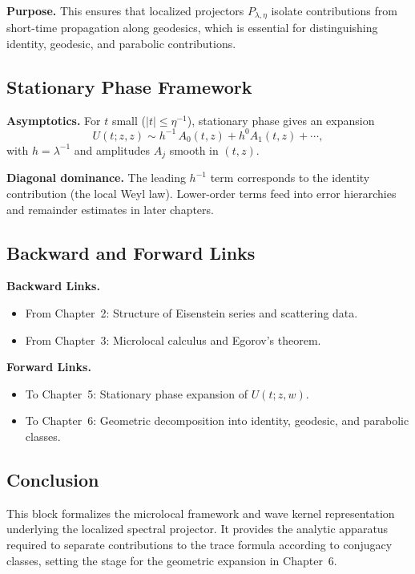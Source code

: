 \medskip

\noindent\textbf{Purpose.}
This ensures that localized projectors $P_{\lambda,\eta}$ isolate contributions from short-time propagation along geodesics, which is essential for distinguishing identity, geodesic, and parabolic contributions.

\subsection{Stationary Phase Framework}

\noindent\textbf{Asymptotics.}
For $t$ small ($|t|\le \eta^{-1}$), stationary phase gives an expansion
\[
  U(t;z,z) \sim h^{-1}\,A_0(t,z) + h^0 A_1(t,z) + \cdots,
\]
with $h=\lambda^{-1}$ and amplitudes $A_j$ smooth in $(t,z)$.  

\medskip

\noindent\textbf{Diagonal dominance.}
The leading $h^{-1}$ term corresponds to the identity contribution (the local Weyl law).  
Lower-order terms feed into error hierarchies and remainder estimates in later chapters.

\subsection{Backward and Forward Links}

\noindent\textbf{Backward Links.}
\begin{itemize}
  \item From Chapter~2: Structure of Eisenstein series and scattering data.
  \item From Chapter~3: Microlocal calculus and Egorov’s theorem.
\end{itemize}

\noindent\textbf{Forward Links.}
\begin{itemize}
  \item To Chapter~5: Stationary phase expansion of $U(t;z,w)$.
  \item To Chapter~6: Geometric decomposition into identity, geodesic, and parabolic classes.
\end{itemize}

\subsection{Conclusion}

This block formalizes the microlocal framework and wave kernel representation underlying the localized spectral projector.  
It provides the analytic apparatus required to separate contributions to the trace formula according to conjugacy classes, setting the stage for the geometric expansion in Chapter~6.

